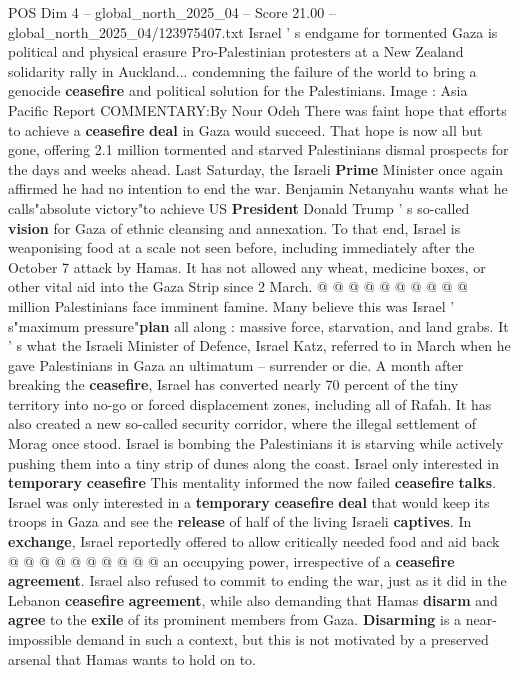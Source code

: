 \begin{textsample}{POS Dim 4 – global\_north\_2025\_04 – Score 21.00 – global\_north\_2025\_04/123975407.txt}  \label{ex:f4_pos_230}
Israel ' s endgame for tormented Gaza is political and physical erasure Pro-Palestinian protesters at a New Zealand solidarity rally in Auckland... condemning the failure of the world to bring a genocide \textbf{ceasefire} and political solution for the Palestinians.
Image : Asia Pacific Report COMMENTARY:By Nour Odeh There was faint hope that efforts to achieve a \textbf{ceasefire} \textbf{deal} in Gaza would succeed.
That hope is now all but gone, offering 2.1 million tormented and starved Palestinians dismal prospects for the days and weeks ahead.
Last Saturday, the Israeli \textbf{Prime} Minister once again affirmed he had no intention to end the war.
Benjamin Netanyahu wants what he calls"absolute victory"to achieve US \textbf{President} Donald Trump ' s so-called \textbf{vision} for Gaza of ethnic cleansing and annexation.
To that end, Israel is weaponising food at a scale not seen before, including immediately after the October 7 attack by Hamas.
It has not allowed any wheat, medicine boxes, or other vital aid into the Gaza Strip since 2 March. @ @ @ @ @ @ @ @ @ @ million Palestinians face imminent famine.
Many believe this was Israel ' s"maximum pressure"\textbf{plan} all along : massive force, starvation, and land grabs.
It ' s what the Israeli Minister of Defence, Israel Katz, referred to in March when he gave Palestinians in Gaza an ultimatum -- surrender or die.
A month after breaking the \textbf{ceasefire}, Israel has converted nearly 70 percent of the tiny territory into no-go or forced displacement zones, including all of Rafah.
It has also created a new so-called security corridor, where the illegal settlement of Morag once stood.
Israel is bombing the Palestinians it is starving while actively pushing them into a tiny strip of dunes along the coast.
Israel only interested in \textbf{temporary} \textbf{ceasefire} This mentality informed the now failed \textbf{ceasefire} \textbf{talks}.
Israel was only interested in a \textbf{temporary} \textbf{ceasefire} \textbf{deal} that would keep its troops in Gaza and see the \textbf{release} of half of the living Israeli \textbf{captives}.
In \textbf{exchange}, Israel reportedly offered to allow critically needed food and aid back @ @ @ @ @ @ @ @ @ @ an occupying power, irrespective of a \textbf{ceasefire} \textbf{agreement}.
Israel also refused to commit to ending the war, just as it did in the Lebanon \textbf{ceasefire} \textbf{agreement}, while also demanding that Hamas \textbf{disarm} and \textbf{agree} to the \textbf{exile} of its prominent members from Gaza. \textbf{Disarming} is a near-impossible demand in such a context, but this is not motivated by a preserved arsenal that Hamas wants to hold on to.

\end{textsample}

